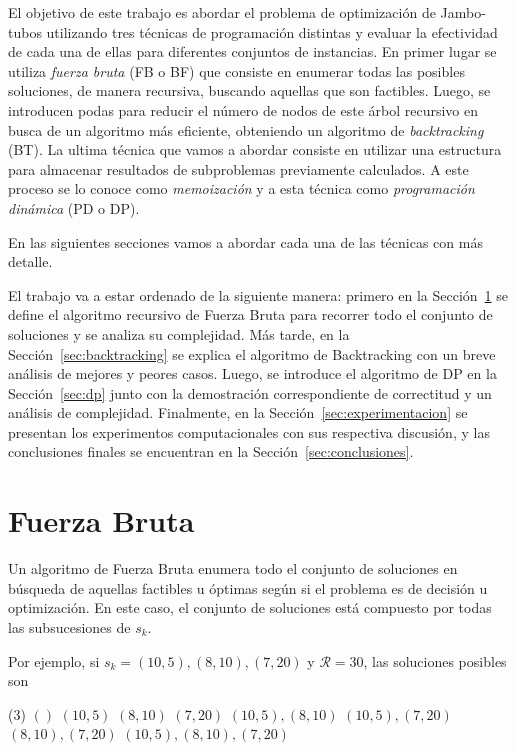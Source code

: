 \documentclass{article}
\newcommand{\Res}{\mathcal{R}}
\begin{document}
El objetivo de este trabajo es abordar el problema de optimización de Jambo-tubos utilizando tres técnicas de programación distintas y evaluar la efectividad de cada una de ellas para diferentes conjuntos de instancias. En primer lugar se utiliza \emph{fuerza bruta} (FB o BF) que consiste en enumerar todas las posibles soluciones, de manera recursiva, buscando aquellas que son factibles. Luego, se introducen podas para reducir el número de nodos de este árbol recursivo en busca de un algoritmo más eficiente, obteniendo un algoritmo de \emph{backtracking} (BT). La ultima técnica que vamos a abordar consiste en utilizar una estructura para almacenar resultados de subproblemas previamente calculados. A este proceso se lo conoce como \emph{memoización} y a esta técnica como \emph{programación dinámica} (PD o DP).

En las siguientes secciones vamos a abordar cada una de las técnicas con más detalle. 

El trabajo va a estar ordenado de la siguiente manera: primero en la Sección~\ref{sec:fuerza_bruta} se define el algoritmo recursivo de Fuerza Bruta para recorrer todo el conjunto de soluciones y se analiza su complejidad. Más tarde, en la Sección~\ref{sec:backtracking} se explica el algoritmo de Backtracking con un breve análisis de mejores y peores casos. Luego, se introduce el algoritmo de DP en la Sección~\ref{sec:dp} junto con la demostración correspondiente de correctitud y un análisis de complejidad. Finalmente, en la Sección~\ref{sec:experimentacion} se presentan los experimentos computacionales con sus respectiva discusión, y las conclusiones finales se encuentran en la Sección~\ref{sec:conclusiones}.

\section{Fuerza Bruta} \label{sec:fuerza_bruta}
Un algoritmo de Fuerza Bruta enumera todo el conjunto de soluciones en búsqueda de aquellas factibles u óptimas según si el problema es de decisión u optimización. En este caso, el conjunto de soluciones está compuesto por todas las subsucesiones de $s_k$.

Por ejemplo, si $s_{k}=(10,5),(8,10),(7,20)$ y $\Res=30$, las soluciones posibles son 

\begin{tasks}(3)
    \task $()$ \label{fact1}
    \task $(10,5)$ \label{fact2}
    \task $(8,10)$ \label{fact3}
    \task $(7,20)$ \label{fact4}
    \task $(10,5),(8,10)$
    \task $(10,5),(7,20)$
    \task $(8,10),(7,20)$ \label{fact5}
    \task $(10,5),(8,10),(7,20)$
\end{tasks}
\end{document}
